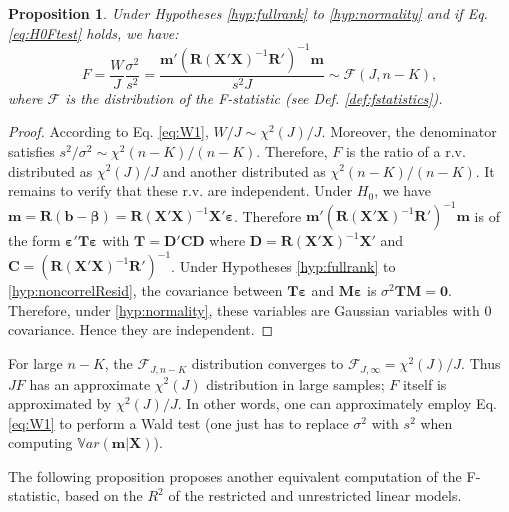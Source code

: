 \documentclass[
  11pt,
]{book}
\newtheorem{proposition}{Proposition}[chapter]
\theoremstyle{definition}
\theoremstyle{definition}
\theoremstyle{definition}
\theoremstyle{definition}
\theoremstyle{remark}
\begin{document}
\begin{proposition}
\protect\hypertarget{prp:Ftest1}{}\label{prp:Ftest1}Under Hypotheses \ref{hyp:fullrank} to \ref{hyp:normality} and if Eq. \eqref{eq:H0Ftest} holds, we have:
\begin{equation}
F = \frac{W}{J}\frac{\sigma^2}{s^2} = \frac{\mathbf{m}'(\mathbf{R}(\mathbf{X}'\mathbf{X})^{-1}\mathbf{R}')^{-1}\mathbf{m}}{s^2J} \sim \mathcal{F}(J,n-K),\label{eq:defFstatistics}
\end{equation}
where \(\mathcal{F}\) is the distribution of the F-statistic (see Def. \ref{def:fstatistics}).
\end{proposition}

\begin{proof}
According to Eq. \eqref{eq:W1}, \(W/J \sim \chi^2(J)/J\). Moreover, the denominator satisfies \(s^2/\sigma^2\sim\chi^2(n-K)/(n-K)\). Therefore, \(F\) is the ratio of a r.v. distributed as \(\chi^2(J)/J\) and another distributed as \(\chi^2(n-K)/(n-K)\). It remains to verify that these r.v. are independent. Under \(H_0\), we have \(\mathbf{m} =  \mathbf{R}(\mathbf{b}-\boldsymbol\beta) = \mathbf{R}(\mathbf{X}'\mathbf{X})^{-1}\mathbf{X}'\boldsymbol\varepsilon\).
Therefore \(\mathbf{m}'(\mathbf{R}(\mathbf{X}'\mathbf{X})^{-1}\mathbf{R}')^{-1}\mathbf{m}\) is of the form \(\boldsymbol\varepsilon'\mathbf{T}\boldsymbol\varepsilon\) with \(\mathbf{T}=\mathbf{D}'\mathbf{C}\mathbf{D}\) where \(\mathbf{D}=\mathbf{R}(\mathbf{X}'\mathbf{X})^{-1}\mathbf{X}'\) and \(\mathbf{C}=(\mathbf{R}(\mathbf{X}'\mathbf{X})^{-1}\mathbf{R}')^{-1}\). Under Hypotheses \ref{hyp:fullrank} to \ref{hyp:noncorrelResid}, the covariance between \(\mathbf{T}\boldsymbol\varepsilon\) and \(\mathbf{M}\boldsymbol\varepsilon\) is \(\sigma^2\mathbf{T}\mathbf{M} = \mathbf{0}\). Therefore, under \ref{hyp:normality}, these variables are Gaussian variables with 0 covariance. Hence they are independent.
\end{proof}

For large \(n-K\), the \(\mathcal{F}_{J,n-K}\) distribution converges to \(\mathcal{F}_{J,\infty}=\chi^2(J)/J\). Thus \(JF\) has an approximate \(\chi^2(J)\) distribution in large samples; \(F\) itself is approximated by \(\chi^2(J)/J\). In other words, one can approximately employ Eq. \eqref{eq:W1} to perform a Wald test (one just has to replace \(\sigma^2\) with \(s^2\) when computing \(\mathbb{V}ar(\mathbf{m}|\mathbf{X})\)).

The following proposition proposes another equivalent computation of the F-statistic, based on the \(R^2\) of the restricted and unrestricted linear models.
\end{document}
